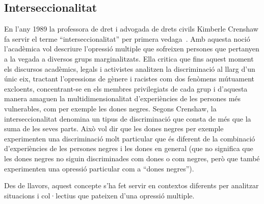 \subsection{Interseccionalitat}
En l'any 1989 la professora de dret i advogada de drets civils Kimberle Crenshaw fa servir el terme ``interseccionalitat'' per primera vedaga~\autocite{Crenshaw1989}.
Amb aquesta noció l'acadèmica vol descriure l'opressió multiple que sofreixen persones que pertanyen a la vegada a diversos grups marginalitzats.
Ella critica que fins aquest moment els discursos acadèmics, legals i activistes analitzen la discriminació al llarg d'un únic eix,
tractant l'opressions de gènere i racistes com dos fenòmens mútuament excloents,
concentrant-se en els membres privilegiats de cada grup i d'aquesta manera amaguen la multidimensionalitat d'experiències de les persones més vulnerables, com per exemple les dones negres.
Segons Crenshaw, la interseccionalitat denomina un tipus de discriminació que consta de més que la suma de les seves parts.
Això vol dir que les dones negres per exemple experimenten una discriminació molt particular que és diferent de la combinació d'experiències de les persones negres i les dones en general (que no significa que les dones negres no siguin discriminades com dones o com negres, però que també experimenten una opressió particular com a ``dones negres'').

Des de llavors, aquest concepte s'ha fet servir en contextos diferents per analitzar situacions i col·lectius que pateixen d'una opressió multiple.

\begin{comment}
"Jo vaig anar a aportar la matrícula, ja aterrida de tants passadissos i tantes aules i si no sé ni trobar les oficines, com m'ho faré per trobar la meva classe.
 El primer dia ens van fer anar a la sala d'actes i allà van dir les llistes de cada grup. Tothom va riure quan van dir el meu nom, que el van dir tan diferent que jo no sabi ni que fos jo. És clar, en aquell lloc no hi estaven acostumats, a gent com jo. Era l'única de la classe que feia batxillerat, tota sola sense ni el noi dels ulls crema que havia de ser amb mi sempre"
 -- anders sein faellt ins Auge;
    Menschen machen sich lustig;
    Migrant*innenkids werden rausgeekelt oder von ihren Eltern aus der Schule rausgeholt

"[...] i jo que havia trencat lleis no escrites i havia decidit que no volia ser ni auxiliar d'infermeria ni administrativa de grau u ni mecànic ni electricista.
  Pesaven força espases de Dàmocles damunt meu: que si jo a la teva edat ja estava casada, que si en la teva cultura ja se sap que no val la pena, que us acaben casant tard o d'hora, la d'aquest és l'últim curs i alguna altra que tenia el pare al cap, com allò de les dones que no traeixen mai els pares però que sí que acaben traint els homes.
  Tot això duia jo a la motxilla, però ningú se'n va adonar. Al principi l'institut va ser un espai d'angoixa, que tot funcionés tan diferent" (p.273)

\end{comment}

